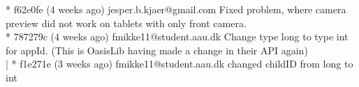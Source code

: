 * f62e0fe (4 weeks ago) jesper.b.kjaer@gmail.com Fixed problem, where camera preview did not work on tablets with only front camera.\\
* 787279c (4 weeks ago) fmikke11@student.aau.dk Change type long to type int for appId. (This is OasisLib having made a change in their API again)\\
| * f1e271e (3 weeks ago) fmikke11@student.aau.dk changed childID from long to int\\